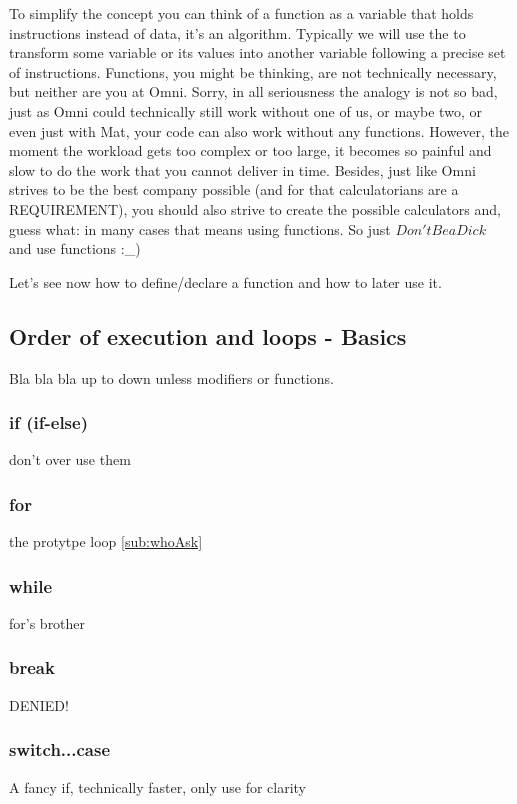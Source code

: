 To simplify the concept you can think of a function as a variable that holds instructions instead of data, it's an algorithm. Typically we will use the to transform some variable or its values into another variable following a precise set of instructions. Functions, you might be thinking, are not technically necessary, but neither are you at Omni. Sorry, in all seriousness the analogy is not so bad, just as Omni could technically still work without one of us, or maybe two, or even just with Mat, your code can also work without any functions. However, the moment the workload gets too complex or too large, it becomes so painful and slow to do the work that you cannot deliver in time. Besides, just like Omni strives to be the best company possible (and for that calculatorians are a REQUIREMENT), you should also strive to create the possible calculators and, guess what: in many cases that means using functions. So just $Don't Be a Dick$\texttrademark \vspace{2pt} and use functions :\_)

Let's see now how to define/declare a function and how to later use it.

\subsection{Order of execution and loops - Basics}
\label{sub:execBasic}
Bla bla bla up to down unless modifiers or functions.
\subsubsection{if (if-else)}
\label{subsub:if}
don't over use them

\subsubsection{for}
\label{subsub:for}
the protytpe loop \ref{sub:whoAsk}

\subsubsection{while}
\label{sub:while}
for's brother

\subsubsection{break}
\label{subsub:break}
DENIED!

\subsubsection{switch...case}
\label{subsub:switch}
A fancy if, technically faster, only use for clarity

